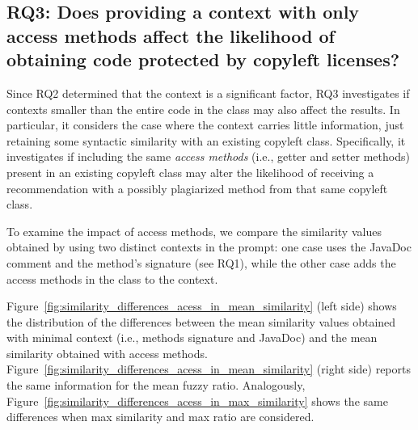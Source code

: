 \noindent {}


 \subsection{RQ3: Does providing a context with only access methods affect the likelihood of obtaining code protected by copyleft licenses?}

Since RQ2 determined that the context is a significant factor, RQ3 investigates if contexts smaller than the entire code in the class may also affect the results. In particular, it considers the case where the context carries little information, just retaining some syntactic similarity with an existing copyleft class. Specifically, it investigates if including the same \emph{access methods} (i.e., getter and setter methods) present in an existing copyleft class may alter the likelihood of receiving a recommendation with a possibly plagiarized method from that same copyleft class.

To examine the impact of access methods, we compare the similarity values obtained by using two distinct contexts in the prompt: one case uses the JavaDoc comment and the method's signature (see RQ1), while the other case adds the access methods in the class to the context. %

Figure~\ref{fig:similarity_differences_acess_in_mean_similarity} (left side) shows the distribution of the differences between the mean similarity values obtained with minimal context (i.e., methods signature and JavaDoc) and the mean similarity obtained with access methods.  Figure~\ref{fig:similarity_differences_acess_in_mean_similarity} (right side) reports the same information for the mean fuzzy ratio. Analogously, Figure~\ref{fig:similarity_differences_acess_in_max_similarity} shows the same differences when max similarity and max ratio are considered.

